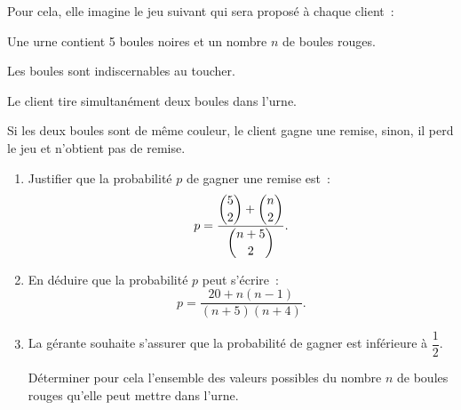 Pour cela, elle imagine le jeu suivant qui sera proposé à chaque client~:

Une urne contient 5 boules noires et un nombre $n$ de boules rouges.

Les boules sont indiscernables au toucher.

Le client tire simultanément deux boules dans l'urne.

Si les deux boules sont de même couleur, le client gagne une remise, sinon, il perd le jeu et n'obtient pas de remise.

\begin{enumerate}
\item Justifier que la probabilité $p$ de gagner une remise est~:
\[
p = \dfrac{\dbinom{5}{2} + \dbinom{n}{2}}{\dbinom{n+5}{2}}.
\]
\item En déduire que la probabilité $p$ peut s'écrire~:
\[
p = \dfrac{20 + n(n-1)}{(n+5)(n+4)}.
\]
\item La gérante souhaite s'assurer que la probabilité de gagner est inférieure à $\dfrac{1}{2}$.

Déterminer pour cela l'ensemble des valeurs possibles du nombre $n$ de boules rouges qu'elle peut mettre dans l'urne.
\end{enumerate}

\bigskip
